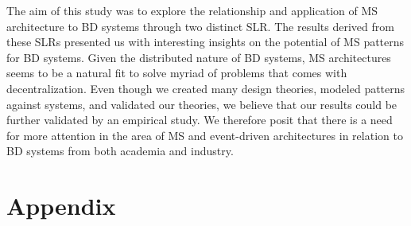 \documentclass{bmcart}
\begin{document}
The aim of this study was to explore the relationship and application of MS architecture to BD systems through two distinct SLR. The results derived from these SLRs presented us with interesting insights on the potential of MS patterns for BD systems. Given the distributed nature of BD systems, MS architectures seems to be a natural fit to solve myriad of problems that comes with decentralization. Even though we created many design theories, modeled patterns against systems, and validated our theories, we believe that our results could be further validated by an empirical study. We therefore posit that there is a need for more attention in the area of MS and event-driven architectures in relation to BD systems from both academia and industry. 

\section*{Appendix}

\end{document}
